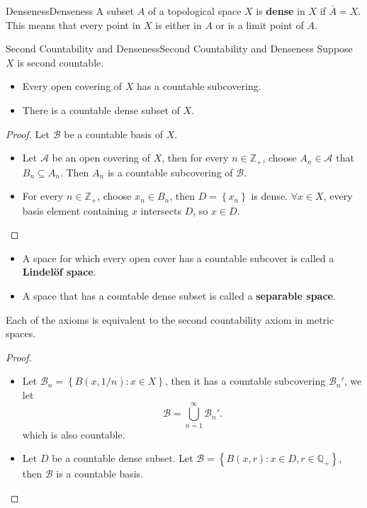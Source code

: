 \documentclass[../main.tex]{subfiles}
\begin{document}
\begin{definition}{Denseness}{Denseness}
	A subset $A$ of a topological space $X$ is \textbf{dense} in $X$ if $\overline{A} = X$. This means that every point in $X$ is either in $A$ or is a limit point of $A$.
\end{definition}

\begin{theorem}{Second Countability and Denseness}{Second Countability and Denseness}
Suppose $X$ is second countable.
\begin{itemize}
\item Every open covering of $X$ has a countable subcovering.
\item There is a countable dense subset of $X$.
\end{itemize}
\end{theorem}
\begin{proof}
	Let $\mathcal{B}$ be a countable basis of $X$.
	\begin{itemize}
		\item Let $\mathcal{A}$ be an open covering of $X$, then for every $n\in \mathbb{Z}_+$, choose $A_n\in \mathcal{A}$ that $B_n \subseteq A_n$. Then $A_n$ is a countable subcovering of $\mathcal{B}$.
		\item For every $n\in \mathbb{Z}_+$, choose $x_n\in B_n$, then $D = \left\{ x_n \right\}$ is dense. $\forall x\in X$, every basis element containing $x$ intersects $D$, so $x\in \overline{D}$.
	\end{itemize}
\end{proof}

\begin{remark}
\begin{itemize}
	\item A space for which every open cover has a countable subcover is called a \textbf{Lindel\"of space}.
	\item A space that has a countable dense subset is called a \textbf{separable space}.
\end{itemize}
Each of the axioms is equivalent to the second countability axiom in metric spaces.
\begin{proof}
\begin{itemize}
\item Let $\mathcal{B}_n = \left\{ B(x,1 / n):x\in X \right\}$, then it has a countable subcovering $\mathcal{B}_n'$, we let
	\begin{equation*}
		\mathcal{B} = \bigcup_{n=1}^{\infty} \mathcal{B}_n'.
	\end{equation*}
	which is also countable.
\item Let $D$ be a countable dense subset. Let $\mathcal{B} = \left\{ B(x, r):x\in D, r\in \mathbb{Q}_+ \right\}$, then $\mathcal{B}$ is a countable basis.
\end{itemize}
\end{proof}
\end{remark}
\end{document}
